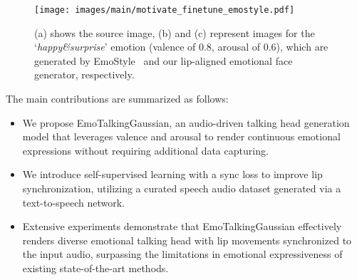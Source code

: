 \begin{figure}[t]
    \centering
    \texttt{[image: images/main/motivate\_finetune\_emostyle.pdf]}
    \vspace{-3mm}
    \caption{(a) shows the source image, (b) and (c) represent images for the `\emph{happy\&surprise}' emotion (valence of 0.8, arousal of 0.6), which are generated by EmoStyle~\cite{azari2024emostyle} and our lip-aligned emotional face generator, respectively. 
    }
    \label{fig:motivate finetune emotstyle}
    \vspace{-3mm}
\end{figure}

The main contributions are summarized as follows:
\begin{itemize}
    \item We propose EmoTalkingGaussian, an audio-driven talking head generation model that leverages valence and arousal to render continuous emotional expressions without requiring additional data capturing.

    \item We introduce self-supervised learning with a sync loss to improve lip synchronization, utilizing a curated speech audio dataset generated via a text-to-speech network.

    \item Extensive experiments demonstrate that EmoTalkingGaussian effectively renders diverse emotional talking head with lip movements synchronized to the input audio, surpassing the limitations in emotional expressiveness of existing state-of-the-art methods.
\end{itemize}




